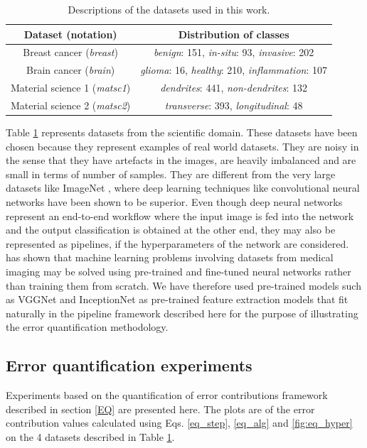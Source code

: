 \begin{table}[ht!]
\centering
\caption{Descriptions of the datasets used in this work.}
\begin{tabular}{ |c|c| } 
 \hline
 Dataset (notation) & Distribution of classes \\ 
 \hline
 Breast cancer (\textit{breast}) \cite{bilgin2007cell} & \textit{benign}: 151, \textit{in-situ}: 93, \textit{invasive}: 202\\
 \hline
 Brain cancer (\textit{brain}) \cite{gunduz2004cell} & \textit{glioma}: 16, \textit{healthy}: 210, \textit{inflammation}: 107\\
 \hline
  Material science 1 (\textit{matsc1}) \cite{chowdhury2016image} & \textit{dendrites}: 441, \textit{non-dendrites}: 132 \\
 \hline
 Material science 2 (\textit{matsc2}) \cite{chowdhury2016image} & \textit{transverse}: 393, \textit{longitudinal}: 48 \\
 \hline
 \end{tabular}
\label{table:datasets}
\end{table}
Table \ref{table:datasets} represents datasets from the scientific domain. These datasets have been chosen because they represent examples of real world datasets. They are noisy in the sense that they have artefacts in the images, are heavily imbalanced and are small in terms of number of samples. They are different from the very large datasets like ImageNet \cite{deng2009imagenet}, where deep learning techniques like convolutional neural networks have been shown to be superior. Even though deep neural networks represent an end-to-end workflow where the input image is fed into the network and the output classification is obtained at the other end, they may also be represented as pipelines, if the hyperparameters of the network are considered. \cite{shin2016deep} has shown that machine learning problems involving datasets from medical imaging may be solved using pre-trained and fine-tuned neural networks rather than training them from scratch. We have therefore used pre-trained models such as VGGNet \cite{simonyan2014very} and InceptionNet \cite{szegedy2016rethinking} as pre-trained feature extraction models that fit naturally in the pipeline framework described here for the purpose of illustrating the error quantification methodology.

\subsection{Error quantification experiments}
\label{eq_expts}
Experiments based on the quantification of error contributions framework described in section \ref{EQ} are presented here. The plots are of the error contribution values calculated using Eqs. \ref{eq_step}, \ref{eq_alg} and \ref{fig:eq_hyper} on the 4 datasets described in Table \ref{table:datasets}. 
